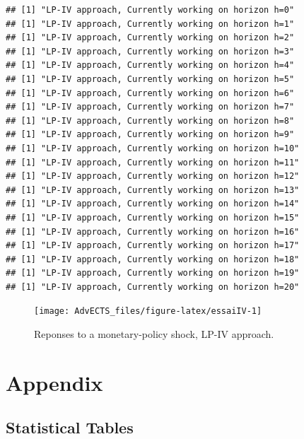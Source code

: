 \documentclass[
]{book}
\theoremstyle{definition}
\theoremstyle{definition}
\theoremstyle{definition}
\theoremstyle{definition}
\theoremstyle{remark}
\begin{document}
\begin{verbatim}
## [1] "LP-IV approach, Currently working on horizon h=0"
## [1] "LP-IV approach, Currently working on horizon h=1"
## [1] "LP-IV approach, Currently working on horizon h=2"
## [1] "LP-IV approach, Currently working on horizon h=3"
## [1] "LP-IV approach, Currently working on horizon h=4"
## [1] "LP-IV approach, Currently working on horizon h=5"
## [1] "LP-IV approach, Currently working on horizon h=6"
## [1] "LP-IV approach, Currently working on horizon h=7"
## [1] "LP-IV approach, Currently working on horizon h=8"
## [1] "LP-IV approach, Currently working on horizon h=9"
## [1] "LP-IV approach, Currently working on horizon h=10"
## [1] "LP-IV approach, Currently working on horizon h=11"
## [1] "LP-IV approach, Currently working on horizon h=12"
## [1] "LP-IV approach, Currently working on horizon h=13"
## [1] "LP-IV approach, Currently working on horizon h=14"
## [1] "LP-IV approach, Currently working on horizon h=15"
## [1] "LP-IV approach, Currently working on horizon h=16"
## [1] "LP-IV approach, Currently working on horizon h=17"
## [1] "LP-IV approach, Currently working on horizon h=18"
## [1] "LP-IV approach, Currently working on horizon h=19"
## [1] "LP-IV approach, Currently working on horizon h=20"
\end{verbatim}

\begin{figure}
\texttt{[image: AdvECTS\_files/figure-latex/essaiIV-1]} \caption{Reponses to a monetary-policy shock, LP-IV approach.}\label{fig:essaiIV}
\end{figure}

\hypertarget{append}{%
\chapter{Appendix}\label{append}}

\hypertarget{statistical-tables}{%
\section{Statistical Tables}\label{statistical-tables}}
\end{document}
